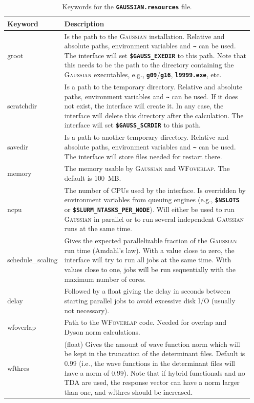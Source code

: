 \documentclass[a4paper,10pt,DIV=15,openany]{scrbook}
\newcommand{\ttt}[1]{\textbf{\texttt{#1}}}
\begin{document}
\begin{table}
  \centering
  \caption{Keywords for the \ttt{GAUSSIAN.resources} file.}
  \label{tab:gauss_sh2}
  \begin{tabular}{>{\ttfamily}lp{12cm}}
  \hline
  Keyword       &Description\\
  \hline
groot                   &Is the path to the \textsc{Gaussian} installation. Relative and absolute paths, environment variables and \ttt{\textasciitilde} can be used. The interface will set \ttt{\$GAUSS\_EXEDIR} to this path. 
Note that this needs to be the path to the directory containing the \textsc{Gaussian} executables, e.g., \ttt{g09}/\ttt{g16}, \ttt{l9999.exe}, etc.
\\
scratchdir              &Is a path to the temporary directory. Relative and absolute paths, environment variables and \ttt{\textasciitilde} can be used. If it does not exist, the interface will create it. In any case, the interface will delete this directory after the calculation. The interface will set \ttt{\$GAUSS\_SCRDIR} to this path.
\\
savedir                 &Is a path to another temporary directory.  Relative and absolute paths, environment variables and \ttt{\textasciitilde} can be used. The interface will store files needed for restart there.
\\
memory                  &The memory usable by \textsc{Gaussian} and \textsc{WFoverlap}. The default is 100~MB. 
\\
ncpu                    &The number of CPUs used by the interface. Is overridden by environment variables from queuing engines (e.g., \ttt{\$NSLOTS} or \ttt{\$SLURM\_NTASKS\_PER\_NODE}). Will either be used to run \textsc{Gaussian} in parallel or to run several independent \textsc{Gaussian} runs at the same time.
\\
schedule\_scaling       &Gives the expected parallelizable fraction of the \textsc{Gaussian} run time (Amdahl's law). With a value close to zero, the interface will try to run all jobs at the same time. With values close to one, jobs will be run sequentially with the maximum number of cores.
\\
delay                   &Followed by a float giving the delay in seconds between starting parallel jobs to avoid excessive disk I/O (usually not necessary).
\\
wfoverlap               &Path to the \textsc{WFoverlap} code. Needed for overlap and Dyson norm calculations.
\\
wfthres                 &(float) Gives the amount of wave function norm which will be kept in the truncation of the determinant files. Default is 0.99 (i.e., the wave functions in the determinant files will have a norm of 0.99). Note that if hybrid functionals and no TDA are used, the response vector can have a norm larger than one, and wfthres should be increased.

\end{tabular}
\end{table}
\end{document}
